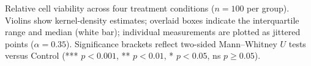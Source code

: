 \caption{Relative cell viability across four treatment conditions ($n = 100$ per group).
Violins show kernel-density estimates; overlaid boxes indicate the interquartile range and median (white bar);
individual measurements are plotted as jittered points ($\alpha = 0.35$).
Significance brackets reflect two-sided Mann--Whitney $U$ tests versus Control
(*** $p < 0.001$, ** $p < 0.01$, * $p < 0.05$, ns $p \geq 0.05$).}
